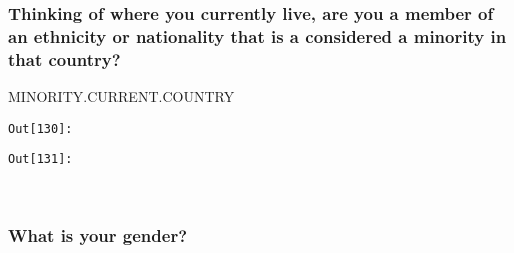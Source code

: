 \documentclass[11pt]{article}
\begin{document}
    \subsubsection{Thinking of where you currently live, are you a member of
an ethnicity or nationality that is a considered a minority in that
country?}\label{thinking-of-where-you-currently-live-are-you-a-member-of-an-ethnicity-or-nationality-that-is-a-considered-a-minority-in-that-country}

MINORITY.CURRENT.COUNTRY

\texttt{\color{outcolor}Out[{\color{outcolor}130}]:}
    

    

\texttt{\color{outcolor}Out[{\color{outcolor}131}]:}
    

    


    \begin{center}
    \end{center}
    { \hspace*{\fill} \\}
    
    \subsubsection{What is your gender?}\label{what-is-your-gender}
\end{document}
